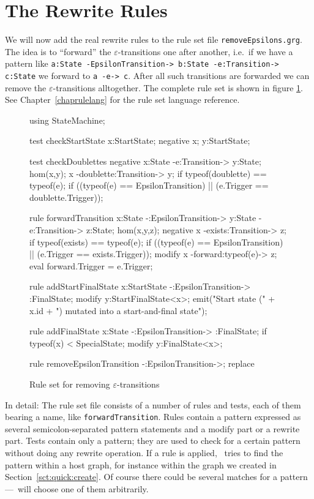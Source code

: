 \section{The Rewrite Rules}
We will now add the real rewrite rules to the rule set file \texttt{removeEpsilons.grg}.
The idea is to ``forward'' the $\varepsilon$-transitions one after another, i.e.\ if we have a pattern like \texttt{a:State -EpsilonTransition-> b:State -e:Transition-> c:State} we forward to \texttt{a -e-> c}.
After all such transitions are forwarded we can remove the $\varepsilon$-transitions alltogether.
The complete rule set is shown in figure \ref{fig:quick:ruleset}.
See Chapter~\ref{chaprulelang} for the rule set language reference.
\begin{figure}[htbp]
	\centering
	\begin{grgen}
using StateMachine;

test checkStartState {
    x:StartState;
    negative {
        x;
        y:StartState;
    }
}

test checkDoublettes {
    negative {
        x:State -e:Transition-> y:State;
        hom(x,y);
        x -doublette:Transition-> y;
        if {typeof(doublette) == typeof(e);}
        if { ((typeof(e) == EpsilonTransition) || (e.Trigger == doublette.Trigger)); }
    }
}

rule forwardTransition {
    x:State -:EpsilonTransition-> y:State -e:Transition-> z:State;
    hom(x,y,z);
    negative {
        x -exists:Transition-> z;
        if {typeof(exists) == typeof(e);}
        if { ((typeof(e) == EpsilonTransition) || (e.Trigger == exists.Trigger)); }
    }
    modify {
        x -forward:typeof(e)-> z;
        eval {forward.Trigger = e.Trigger;}
    }
}

rule addStartFinalState {
    x:StartState -:EpsilonTransition-> :FinalState;
    modify {
        y:StartFinalState<x>;
        emit("Start state (" + x.id +  ") mutated into a start-and-final state");
    }
}

rule addFinalState {
    x:State -:EpsilonTransition-> :FinalState;
    if {typeof(x) < SpecialState;}
    modify {
        y:FinalState<x>;
    }
}

rule removeEpsilonTransition {
    -:EpsilonTransition->;
    replace {}
}
	\end{grgen}
	\caption{Rule set for removing $\varepsilon$-transitions}
	\label{fig:quick:ruleset}
\end{figure}

In detail: The rule set file consists of a number of rules and tests, each of them bearing a name, like \texttt{forwardTransition}.
Rules contain a pattern expressed as several semicolon-separated pattern statements and a modify part or a rewrite part.
Tests contain only a pattern; they are used to check for a certain pattern without doing any rewrite operation.
If a rule is applied, \GrG\ tries to find the pattern within a host graph, for instance within the graph we created in Section~\ref{sct:quick:create}.
Of course there could be several matches for a pattern---\GrG\ will choose one of them arbitrarily.

